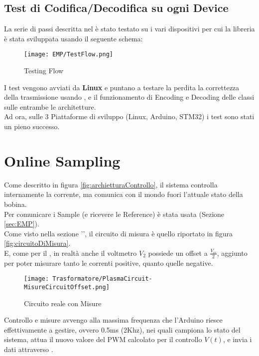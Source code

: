 \subsection{Test di Codifica/Decodifica su ogni Device}
La serie di passi descritta nel  è stato testato su i vari dispositivi per cui la libreria è stata sviluppata usando il seguente schema:
\begin{figure}[H]
	\centering
	\caption[EMP Benchmark Testing Flow]{Testing Flow}
	\texttt{[image: EMP/TestFlow.png]}
\end{figure}

\noindent
I test vengono avviati da \textbf{Linux} e puntano a testare la perdita la correttezza della trasmissione usando , e il funzionamento di Encoding e Decoding delle classi sulle entrambe le architetture.\\
Ad ora, sulle 3 Piattaforme di sviluppo (Linux, Arduino, STM32) i test sono stati un pieno successo.

\newpage
\section{Online Sampling}
Come descritto in figura \ref{fig:archietturaControllo}, il sistema controlla internamente la corrente, ma comunica con il mondo fuori l'attuale stato della bobina.\\
Per comunicare i Sample (e ricevere le Reference) è stata usata (Sezione \ref{sec:EMP}).\\
Come visto nella sezione '', il circuito di misura è quello riportato in figura \ref{fig:circuitoDiMisura}.\\
E, come per il , in realtà anche il voltmetro $V_2$ possiede un offset a $\frac{V_{cc}}{2}$, aggiunto per poter misurare tanto le correnti positive, quanto quelle negative.\vspace{-2mm}
\begin{figure}[H]
	\centering
	\caption[Circuito equivalente del Plasma con l'offset delle Misure]{Circuito reale con Misure}\vspace{2mm}
	\texttt{[image: Trasformatore/PlasmaCircuit-MisureCircuitOffset.png]}
\end{figure}
\noindent
Controllo e misure avvengo alla massima frequenza che l'Arduino riesce effettivamente a gestire, ovvero 0.5ms (2Khz), nei quali campiona lo stato del sistema, attua il nuovo valore del PWM  calcolato per il controllo $V(t)$, e invia i dati attraverso \cite*{EMP}.

